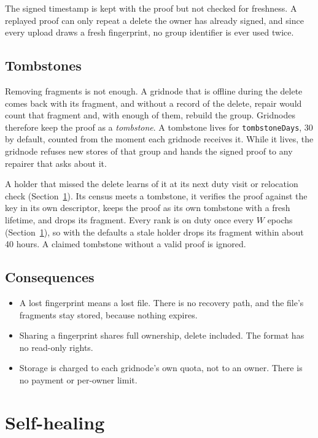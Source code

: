 \documentclass[10pt,a4paper,final]{article}
\newcommand{\code}[1]{\texttt{#1}}
\begin{document}
The signed timestamp is kept with the proof but not checked for freshness. A replayed proof can only repeat a delete
the owner has already signed, and since every upload draws a fresh fingerprint, no group identifier is ever used
twice.

\subsection{Tombstones}

Removing fragments is not enough. A gridnode that is offline during the delete comes back with its fragment, and
without a record of the delete, repair would count that fragment and, with enough of them, rebuild the group.
Gridnodes therefore keep the proof as a \emph{tombstone}. A tombstone lives for \code{tombstoneDays}, 30 by default,
counted from the moment each gridnode receives it. While it lives, the gridnode refuses new stores of that group and
hands the signed proof to any repairer that asks about it.

A holder that missed the delete learns of it at its next duty visit or relocation check (Section~\ref{sec:repair}).
Its census meets a tombstone, it verifies the proof against the key in its own descriptor, keeps the proof as its
own tombstone with a fresh lifetime, and drops its fragment. Every rank is on duty once every $W$ epochs
(Section~\ref{sec:repair}), so with the defaults a stale holder drops its fragment within about 40 hours. A claimed
tombstone without a valid proof is ignored.

\subsection{Consequences}

\begin{itemize}
	\item A lost fingerprint means a lost file. There is no recovery path, and the file's fragments stay stored,
	      because nothing expires.
	\item Sharing a fingerprint shares full ownership, delete included. The format has no read-only rights.
	\item Storage is charged to each gridnode's own quota, not to an owner. There is no payment or per-owner limit.
\end{itemize}

\section{Self-healing}
\label{sec:repair}
\end{document}
